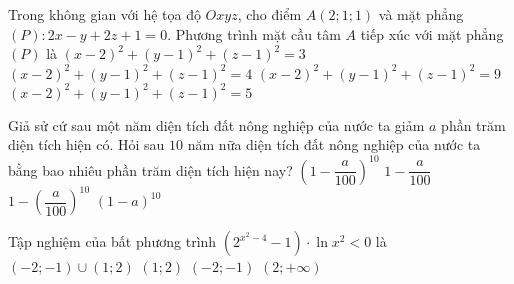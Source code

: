 \begin{ex}%
Trong không gian với hệ tọa độ $Oxyz$, cho điểm $A(2; 1; 1)$ và mặt phẳng $(P)\colon 2x - y + 2z + 1 = 0$. Phương trình mặt cầu tâm $A$ tiếp xúc với mặt phẳng $(P)$ là 
\choice
{$(x - 2)^2 + (y - 1)^2 + (z - 1)^2 = 3$}
{\True $(x - 2)^2 + (y - 1)^2 + (z - 1)^2 = 4$}
{$(x - 2)^2 + (y - 1)^2 + (z - 1)^2 = 9$}
{$(x - 2)^2 + (y - 1)^2 + (z - 1)^2 = 5$}
\end{ex}


\begin{ex}%
Giả sử cứ sau một năm diện tích đất nông nghiệp của nước ta giảm $a$ phần trăm diện tích hiện có. Hỏi sau $10$ năm nữa diện tích đất nông nghiệp của nước ta bằng bao nhiêu phần trăm diện tích hiện nay?
\choice
{\True $\left(1 - \dfrac{a}{100}\right)^{10}$}
{$1 - \dfrac{a}{100}$}
{$1 - \left(\dfrac{a}{100}\right)^{10}$}
{$\left(1 - a\right)^{10}$}
\end{ex}


\begin{ex}%
Tập nghiệm của bất phương trình $\left(2^{x^2 - 4} - 1\right)\cdot \ln x^2 < 0$ là
\choice
{\True $(-2; -1) \cup (1; 2)$}
{$(1; 2)$}
{$(-2; -1)$}
{$(2; + \infty)$}
\end{ex}


